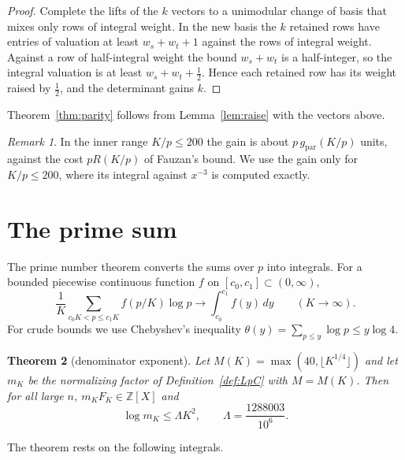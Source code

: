 \documentclass[11pt]{amsart}
\newtheorem{theorem}{Theorem}[section]
\theoremstyle{definition}
\theoremstyle{remark}
\newtheorem{remark}[theorem]{Remark}
\numberwithin{equation}{section}
\newcommand{\Z}{\mathbb Z}
\newcommand{\gref}{g_{\mathrm{par}}}
\begin{document}
\begin{proof}
Complete the lifts of the $k$ vectors to a unimodular change of basis that mixes only rows of integral weight. In the
new basis the $k$ retained rows have entries of valuation at least $w_s+w_t+1$ against the rows of integral weight. Against
a row of half-integral weight the bound $w_s+w_t$ is a half-integer, so the integral valuation is at least
$w_s+w_t+\frac12$. Hence each retained row has its weight raised by $\frac12$, and the determinant gains $k$.
\end{proof}

Theorem~\ref{thm:parity} follows from Lemma~\ref{lem:raise} with the vectors above.

\begin{remark}
In the inner range $K/p\le200$ the gain is about $p\,\gref(K/p)$ units, against the cost $pR(K/p)$ of Fauzan's
bound. We use the gain only for $K/p\le200$, where its integral against $x^{-3}$ is computed exactly.
\end{remark}

\section{The prime sum}\label{sec:sum}

The prime number theorem converts the sums over $p$ into integrals. For a bounded piecewise continuous function $f$ on
$[c_0,c_1]\subset(0,\infty)$,
\begin{equation}\label{eq:pnt}
 \frac1K\sum_{c_0K<p\le c_1K}f(p/K)\log p\longrightarrow\int_{c_0}^{c_1}f(y)\,dy\qquad(K\to\infty).
\end{equation}
For crude bounds we use Chebyshev's inequality $\theta(y)=\sum_{p\le y}\log p\le y\log4$.

\begin{theorem}[denominator exponent]\label{thm:lambda}
Let $M(K)=\max(40,\lfloor K^{1/4}\rfloor)$ and let $m_K$ be the normalizing factor of Definition~\ref{def:LpC} with
$M=M(K)$. Then for all large $n$, $m_KF_K\in\Z[X]$ and
\[
 \log m_K\le\Lambda K^2,\qquad\Lambda=\frac{1288003}{10^6}.
\]
\end{theorem}

The theorem rests on the following integrals.
\end{document}
